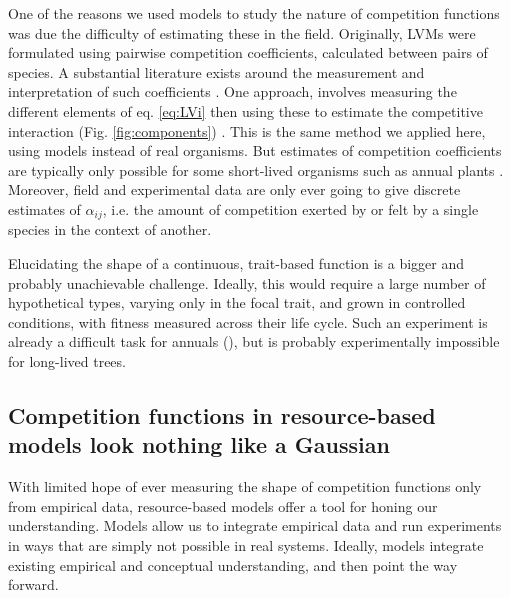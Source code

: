 \documentclass[a4paper,11pt]{article}
\begin{document}
One of the reasons we used models to study the nature of competition functions was due the difficulty of estimating these in the field. Originally, LVMs were formulated using pairwise competition coefficients, calculated between pairs of species. A substantial literature exists around the measurement and interpretation of such coefficients \citep[e.g.]{Ricklefs-1973, Abrams-1980, Law-1997a,Freckleton-2001, Kraft-2015}. One approach, involves measuring the different elements of eq. \ref{eq:LVi} then using these to estimate the competitive interaction (Fig. \ref{fig:components}) \citet{Ricklefs-1973}. This is the same method we applied here, using models instead of real organisms. But estimates of competition coefficients are typically only possible for some short-lived organisms such as annual plants \citep{Kraft-2015, Mayfield-2017, Law-1997,Freckleton-2001}. Moreover, field and experimental data are only ever going to give discrete estimates of $\alpha_{ij}$, i.e. the amount of competition exerted by or felt by a single species in the context of another. 

Elucidating the shape of a continuous, trait-based function is a bigger and probably unachievable challenge. Ideally, this would require a large number of hypothetical types, varying only in the focal trait, and grown in controlled conditions, with fitness measured across their life cycle. Such an experiment is already a difficult task for annuals (\citep{Kraft-2015}), but is probably experimentally impossible for long-lived trees.

\subsection{Competition functions in resource-based models look nothing like a  Gaussian}

With limited hope of ever measuring the shape of competition functions only from empirical data, resource-based models offer a tool for honing our understanding. Models allow us to integrate empirical data and run experiments in ways that are simply not possible in real systems. Ideally, models integrate existing empirical and conceptual understanding, and then point the way forward.
\end{document}
